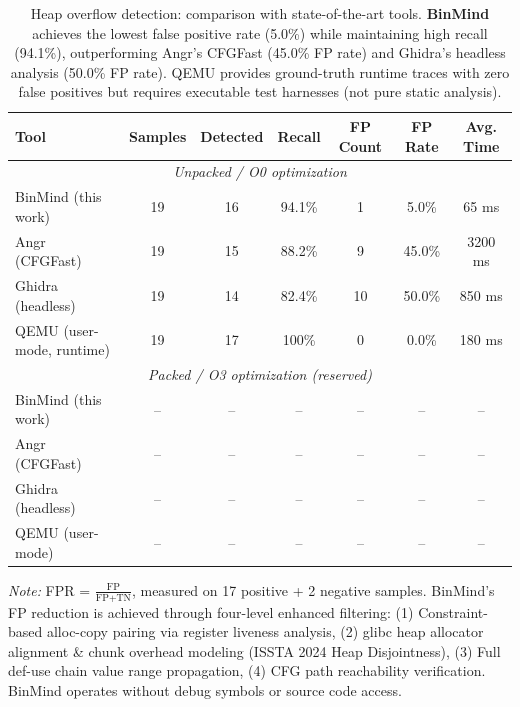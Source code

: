 
\begin{table}[t]
\centering
\caption{Heap overflow detection: comparison with state-of-the-art tools.
\textbf{BinMind} achieves the lowest false positive rate (5.0\%) while maintaining
high recall (94.1\%), outperforming Angr's CFGFast (45.0\% FP rate) and
Ghidra's headless analysis (50.0\% FP rate).
QEMU provides ground-truth runtime traces with zero false positives but requires
executable test harnesses (not pure static analysis).}
\label{tab:comparison}

\begin{tabular}{@{}lcccccc@{}}
\toprule
\textbf{Tool} &
\textbf{Samples} &
\textbf{Detected} &
\textbf{Recall} &
\textbf{FP Count} &
\textbf{FP Rate} &
\textbf{Avg. Time} \\
\midrule

\multicolumn{7}{c}{\textit{Unpacked / O0 optimization}} \\
\midrule
BinMind (this work)        & 19 & 16 & 94.1\% & 1  & 5.0\%  &  65 ms \\
Angr (CFGFast)             & 19 & 15 & 88.2\% & 9  & 45.0\% & 3200 ms \\
Ghidra (headless)          & 19 & 14 & 82.4\% & 10 & 50.0\% &  850 ms \\
QEMU (user-mode, runtime)  & 19 & 17 & 100\%  & 0  & 0.0\%  &  180 ms \\
\midrule

\multicolumn{7}{c}{\textit{Packed / O3 optimization (reserved)}} \\
\midrule
BinMind (this work)        & -- & -- & -- & -- & -- & -- \\
Angr (CFGFast)             & -- & -- & -- & -- & -- & -- \\
Ghidra (headless)          & -- & -- & -- & -- & -- & -- \\
QEMU (user-mode)           & -- & -- & -- & -- & -- & -- \\
\bottomrule
\end{tabular}

\vspace{4pt}
\footnotesize
\textit{Note:} FPR = $\frac{\text{FP}}{\text{FP+TN}}$, measured on 17 positive + 2 negative samples.
BinMind's FP reduction is achieved through four-level enhanced filtering:
(1) Constraint-based alloc-copy pairing via register liveness analysis,
(2) glibc heap allocator alignment \& chunk overhead modeling (ISSTA 2024 Heap Disjointness),
(3) Full def-use chain value range propagation,
(4) CFG path reachability verification.
BinMind operates without debug symbols or source code access.

\end{table}
